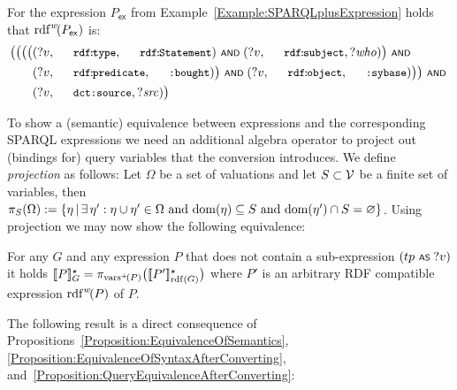 \begin{example} \label{Example:ConvertingSPARQLplusToSPARQL}
	For the {\SPARQLplus} expression $P_\mathsf{ex}$ from Example~\ref{Example:SPARQLplusExpression} holds that $\mathrm{rdf}^{w}\!(P_\mathsf{ex})$ is:
	\begin{align*}
		\bigl( \bigl( \bigl( \bigl( & (?v,\mathTinyRDF{rdf\!:\!type},\mathTinyRDF{rdf\!:\!Statement}) \OpAND (?v,\mathTinyRDF{rdf\!:\!subject},?\mathit{who}) \bigr) \OpAND \\
		& (?v,\mathTinyRDF{rdf\!:\!predicate},\mathTinyRDF{:bought}) \bigr) \OpAND (?v,\mathTinyRDF{rdf\!:\!object},\mathTinyRDF{:sybase}) \bigr) \bigr) \OpAND \\
		& (?v , \mathTinyRDF{dct:source} , ?\mathit{src}) \bigr)	
	\end{align*}
\end{example}

\noindent
To show a (semantic) equivalence between {\SPARQLplus} expressions and the corresponding SPARQL expressions we need an additional algebra operator to project out (bindings for) query variables that the conversion introduces. We define \emph{projection} as follows: Let $\Omega$ be a set of valuations and let $S \subset \mathcal{V}$ be a finite set of variables, then $\pi_S ( \Omega ) := \lbrace \eta \,|\, \exists \, \eta' : \eta \cup \eta' \in \Omega \text{ and } \mathrm{dom}(\eta) \subseteq S \text{ and } \mathrm{dom}(\eta') \cap S = \varnothing \rbrace$.
Using projection we may now show the following equivalence:

\begin{proposition} \label{Proposition:QueryEquivalenceAfterConverting}
	For any {\RDFplusGraph} $G$ and any {\SPARQLplus} expression $P$ that does not contain a sub-expression
	$(tp \text{ \normalfont\scriptsize\textsf{AS} } ?v)$ it holds $[\![P]\!]^\star_{G} = \pi_{\mathrm{vars}^+\!(P)}\bigl( [\![P']\!]^\star_{\mathrm{rdf}(G)} \bigr)$ where $P'$ is an arbitrary RDF compatible expression $\mathrm{rdf}^{w}\!(P)$ of $P$.
\end{proposition}

\noindent
The following result is a direct consequence of Propositions~\ref{Proposition:EquivalenceOfSemantics}, \ref{Proposition:EquivalenceOfSyntaxAfterConverting}, and~\ref{Proposition:QueryEquivalenceAfterConverting}:

